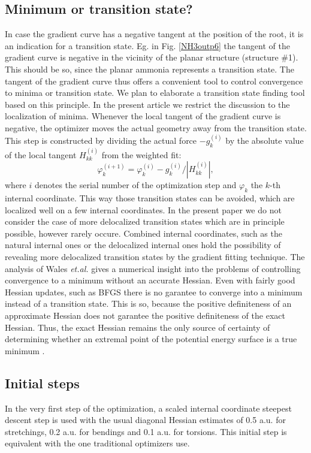 \documentclass[prl,twocolumn,showpacs,twocolumngrid,superbib]{revtex4}
\begin{document}
\subsection{Minimum or transition state?}
In case the gradient curve has a negative tangent at the position
of the root, it is an indication for a transition state. 
Eg. in Fig. \ref{NH3outp6} the tangent of the gradient curve 
is negative in the vicinity of the planar
structure (structure \#1). This should be so, since the planar
ammonia represents a transition state. The tangent of the gradient 
curve thus offers a
convenient tool to control convergence to minima or transition state.
We plan to elaborate a transition state finding tool based on this 
principle. In the present article we restrict the discussion
to the localization of minima. Whenever the local tangent  
of the gradient curve
is negative, the optimizer moves the actual geometry away from 
the transition state.
This step is constructed by dividing the actual force
$-g_{k}^{(i)}$ by the 
absolute value of the local tangent
$H_{kk}^{(i)}$ from the weighted fit:
\begin{equation}
\label{tseq}
\varphi_{k}^{(i+1)} = \varphi_{k}^{(i)} -g_{k}^{(i)}/|H_{kk}^{(i)}| ,
\end{equation}
where $i$ denotes the serial number of the optimization step and
$\varphi_{k}$ the $k$-th internal coordinate.
This way those transition states 
can be avoided, which are localized well on a few internal coordinates. 
In the present paper we do not consider the case of more 
delocalized transition states which are in principle possible,
however rarely occure. Combined internal coordinates, such
as the natural internal ones \cite{Pulay_natural_internals} or the
delocalized internal ones \cite{Baker_deloc_1} hold the possibility
of revealing more delocalized transition states by the
gradient fitting technique. The analysis of Wales {\it et.al.} 
\cite{Wales_saddlepoint}
gives a numerical insight into the problems of controlling
convergence to a minimum without an accurate Hessian.
Even with fairly good Hessian updates, such 
as BFGS \cite{RFletcher} there is no garantee to converge into
a minimum instead of a transition state. This is so, because
the positive definiteness of an approximate Hessian does not garantee
the positive definiteness of the exact Hessian.
Thus, the
exact Hessian remains the only source of certainty
of determining whether an extremal point of the potential energy surface
is a true minimum \cite{fogarasi_diaghess}.

\subsection{Initial steps}
In the very first step of the optimization,
a scaled internal coordinate steepest descent step is used
with the usual diagonal Hessian estimates of
0.5 a.u. for stretchings, 0.2 a.u. for bendings and 0.1 a.u.
for torsions. This initial step is equivalent with the one
traditional optimizers use.
\end{document}
